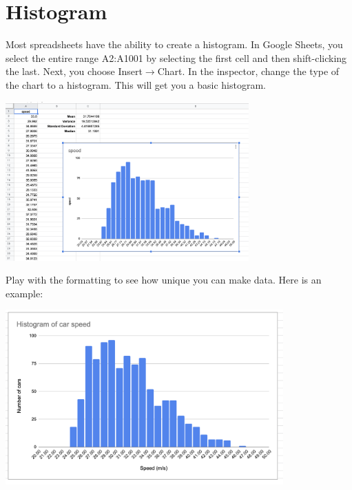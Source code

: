\section{Histogram}

Most spreadsheets have the ability to create a histogram. In Google
Sheets, you select the entire range A2:A1001 by selecting the first
cell and then shift-clicking the last. Next, you choose
Insert$\rightarrow$Chart. In the inspector, change the type of the
chart to a histogram. This will get you a basic histogram.

\includegraphics[width=0.7\textwidth]{default_histogram.png}

Play with the formatting to see how unique you can make data. Here is an example:

\includegraphics[width=0.8\textwidth]{final_histogram.png}

